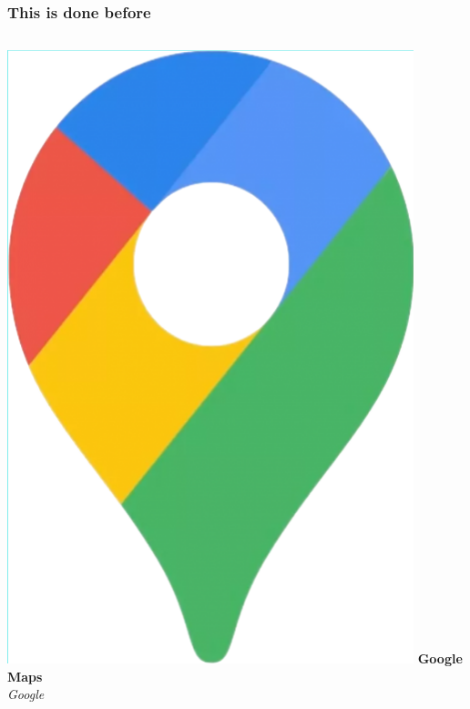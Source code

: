 \documentclass{beamer}
\begin{document}
\begin{frame}
  \frametitle{This is done before}
  \begin{columns}
    \includegraphics[height=0.5\textheight]{./img/google-maps.png}
    \textbf{Google Maps}\\
    \textit{Google}

\end{columns}
\end{frame}
\end{document}
